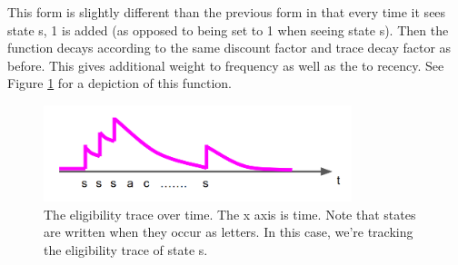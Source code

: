 \documentclass[11pt]{article}
\begin{document}
This form is slightly different than the previous form in that every time it sees state s, 1 is added (as opposed to being set to 1 when seeing state s). Then the function decays according to the same discount factor and trace decay factor as before. This gives additional weight to frequency as well as the to recency. See Figure \ref{fig:eligib} for a depiction of this function.

\begin{figure}
    \centering
    \includegraphics[width=0.8\textwidth]{images/eligibility.png}
    \caption{The eligibility trace over time. The x axis is time. Note that states are written when they occur as letters. In this case, we're tracking the eligibility trace of state s.}
    \label{fig:eligib}
\end{figure}

{


}



\end{document}
